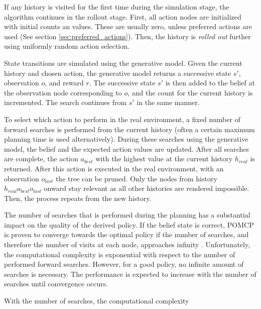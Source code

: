 
If any history is visited for the first time during the simulation stage, the algorithm continues in the rollout stage. First, all action nodes are initialized with initial counts an values. These are usually zero, unless preferred actions are used (See section \ref{sec:preferred_actions}). Then, the history is \textit{rolled out} further using uniformly random action selection.



State transitions are simulated using the generative model. Given the current history and chosen action, the generative model returns a successive state $s'$, observation $o$, and reward $r$. The successive state $s'$ is then added to the belief at the observation node corresponding to $o$, and the count for the current history is incremented. The search continues from $s'$ in the same manner. 



To select which action to perform in the real environment, a fixed number of forward searches is performed from the current history (often a certain maximum planning time is used alternatively). During these searches using the generative model, the belief and the expected action values are updated. After all searches are complete, the action $a_{best}$ with the highest value at the current history $h_{real}$ is returned. After this action is executed in the real environment, with an observation $o_{last}$ the tree can be pruned. Only the nodes from history $h_{real}a_{best}o_{last}$ onward stay relevant as all other histories are rendered impossible. Then, the process repeats from the new history.

The number of searches that is performed during the planning has a substantial impact on the quality of the derived policy. If the belief state is correct, POMCP is proven to converge towards the optimal policy if the number of searches, and therefore the number of visits at each node, approaches infinity \parencite{pomcp}. Unfortunately, the computational complexity is exponential with respect to the number of performed forward searches. However, for a good policy, no infinite amount of searches is necessary. The performance is expected to increase with the number of searches until convergence occurs. 

With the number of searches, the computational complexity 



